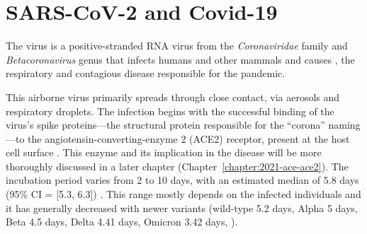 

\clearpage
\section{SARS-CoV-2 and Covid-19}
\label{sec:sars-and-covid}

The \sars virus is a positive-stranded RNA virus from the \textit{Coronaviridae} family and \textit{Betacoronavirus} genus that infects humans and other mammals and causes \covid, the respiratory and contagious disease responsible for the \covid pandemic.

This airborne virus primarily spreads through close contact, via aerosols and respiratory droplets.
The infection begins with the successful binding of the virus's spike proteins---the structural protein responsible for the ``corona'' naming---to the angiotensin-converting-enzyme 2 (ACE2) receptor, present at the host cell surface \citep{ge2013IsolationCharacterization, hoffmann2020SARSCoV2Cell}.
This enzyme and its implication in the disease will be more thoroughly discussed in a later chapter (Chapter~\ref{chapter:2021-ace-ace2}).
The incubation period varies from 2 to 10 days, with an estimated median of 5.8 days (95\% CI = [5.3, 6.3]) \citep{wei2022ComprehensiveEstimation}.
This range mostly depends on the infected individuals and it has generally decreased with newer variants (wild-type 5.2 days, Alpha 5 days, Beta 4.5 days, Delta 4.41 days, Omicron 3.42 days, \citealt{wu2022IncubationPeriod}).

